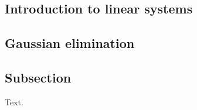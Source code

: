 \documentclass{config/homework}
\begin{document}
    \subsection{Introduction to linear systems}\label{subsec:subsection}

    \subsection{Gaussian elimination}\label{subsec:gaussian-elimination}

    \newpage


    \subsection{Subsection}\label{subsec:subsection2}

    Text.
\end{document}
